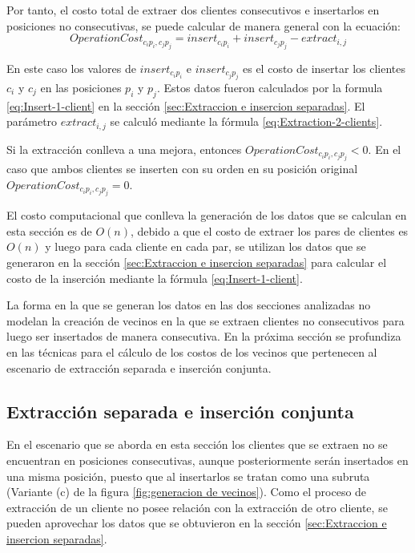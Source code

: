 \documentclass[12pt]{report}
\begin{document}
	Por tanto, el costo total de extraer dos clientes consecutivos e insertarlos en posiciones no consecutivas, se puede calcular de manera general con la ecuación:
	\begin{equation}
		 OperationCost_{c_ip_i,c_jp_j} = insert_{c_ip_i} + insert_{c_jp_j} - extract_{i,j}
		 \label{eq:OperationCost-extract-together}
	\end{equation}

     En este caso los valores de $insert_{c_ip_i}$ e $insert_{c_jp_j}$ es el costo de insertar los clientes $c_i$ y $c_j$ en las posiciones $p_i$ y $p_j$. Estos datos fueron calculados por la formula \ref{eq:Insert-1-client} en la sección \ref{sec:Extraccion e insercion separadas}. El parámetro $extract_{i,j}$ se calculó mediante la fórmula \ref{eq:Extraction-2-clients}.

	Si la extracción conlleva a una mejora, entonces $OperationCost_{c_ip_i,c_jp_j} < 0$. En el caso que ambos clientes se inserten con su orden en su posición original $OperationCost_{c_ip_i,c_jp_j} = 0$.

	El costo computacional que conlleva la generación de los datos que se calculan en esta sección es de $O(n)$, debido a que el costo de extraer los pares de clientes es $O(n)$ y luego para cada cliente en cada par, se utilizan los datos que se generaron en la sección \ref{sec:Extraccion e insercion separadas} para calcular el costo de la inserción mediante la fórmula \ref{eq:Insert-1-client}.

	La forma en la que se generan los datos en las dos secciones analizadas no modelan la creación de vecinos en la que se extraen clientes no consecutivos para luego ser insertados de manera consecutiva. En la próxima sección se profundiza en las técnicas para el cálculo de los costos de los vecinos que pertenecen al escenario de extracción separada e inserción conjunta.

	\subsection{Extracción separada e inserción conjunta}
	\label{sec:Extracción separada e inserción conjunta}

	En el escenario que se aborda en esta sección los clientes que se extraen no se encuentran en posiciones consecutivas, aunque posteriormente serán insertados en una misma posición, puesto que al insertarlos se tratan como una subruta (Variante (c) de la figura \ref{fig:generacion de vecinos}). Como el proceso de extracción de un cliente no posee relación con la extracción de otro cliente, se pueden aprovechar los datos que se obtuvieron en la sección \ref{sec:Extraccion e insercion separadas}.
\end{document}

